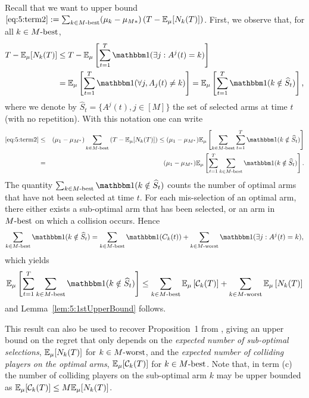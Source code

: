 \begin{smallproof}
  Recall that we want to upper bound
  $ \ref{eq:5:term2} : = \sum_{k \in M\text{-}\mathrm{best}} (\mu_k - \mu_{M*}) \left(T - \mathbb{E}_{\mu}[N_k(T)]\right)$.
  First, we observe that, for all $k\in M\text{-}\mathrm{best}$,
  \begin{eqnarray*}
    T - \E_{\mu}[N_k(T)] & \leq T - \E_{\mu}\left[\sum_{t=1}^T \indic(\exists j : A^j(t) = k)\right] \\
    & = \E_{\mu}\left[\sum_{t=1}^T \indic(\forall j, A_j(t) \neq k)\right] = \E_{\mu}\left[\sum_{t=1}^T \indic(k \notin \widehat{S}_t)\right],
  \end{eqnarray*}
  where we denote by $\widehat{S}_t = \{A^j(t), j \in [M]\}$ the set of selected arms at time $t$ (with no repetition). With this notation one can write
  \begin{eqnarray*}
  \ref{eq:5:term2} & \leq & (\mu_1 - \mu_{M^*})  \sum_{k \in \Mbest} \left(T - \E_{\mu}[N_k(T)]\right) \leq  (\mu_1 - \mu_{M^*})  \E_{\mu}\left[\sum_{k \in \Mbest} \sum_{t = 1}^T \indic(k \notin \widehat{S}_t)\right] \\
  & = &  (\mu_1 - \mu_{M^*})  \E_{\mu}\left[ \sum_{t = 1}^T \sum_{k \in \Mbest}\indic(k \notin \widehat{S}_t)\right].
  \end{eqnarray*}
  The quantity $\sum_{k \in \Mbest}\indic(k \notin \widehat{S}_t)$ counts the number of optimal arms that have not been selected at time $t$. For each mis-selection of an optimal arm, there either exists a sub-optimal arm that has been selected, or an arm in $M\text{-}\mathrm{best}$ on which a collision occurs. Hence
  \[\sum_{k \in \Mbest}\indic(k \notin \widehat{S}_t) = \sum_{k \in \Mbest}\indic(C_k(t)) + \sum_{k \in \Mworst} \indic(\exists j : A^j(t) = k),\]
  which yields
  \[\E_{\mu}\left[ \sum_{t = 1}^T \sum_{k \in \Mbest}\indic(k \notin \widehat{S}_t)\right] \leq \sum_{k \in \Mbest}\E_{\mu}\left[\cC_k(T)\right] + \sum_{k \in \Mworst} \E_{\mu}\left[N_k(T)\right]\]
  and Lemma~\ref{lem:5:1stUpperBound} follows.
\end{smallproof}


This result can also be used to recover Proposition~1 from \cite{Anandkumar11}, giving an upper bound on the regret that only depends on
the \emph{expected number of sub-optimal selections}, $\mathbb{E}_{\mu}[N_k(T)]$ for $k \in M\text{-}\mathrm{worst}$,
and the \emph{expected number of colliding players on the optimal arms}, $\mathbb{E}_{\mu}[\mathcal{C}_k(T)]$ for $k \in M\text{-}\mathrm{best}$. Note that, in term (c) the number of colliding players on the sub-optimal arm $k$ may be upper bounded as $\mathbb{E}_{\mu}[\mathcal{C}_k(T)] \leq M \mathbb{E}_{\mu}[N_k(T)]$.
%

